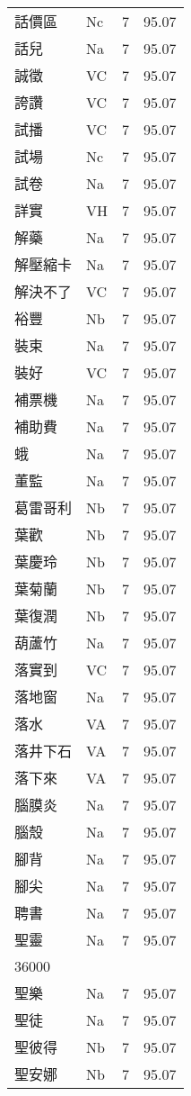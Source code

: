 \documentclass[twocolumn]{book}
\begin{document}
\begin{supertabular}{llrr}
話價區 & Nc & 7 &  95.07\\
話兒 & Na & 7 &  95.07\\
誠徵 & VC & 7 &  95.07\\
誇讚 & VC & 7 &  95.07\\
試播 & VC & 7 &  95.07\\
試場 & Nc & 7 &  95.07\\
試卷 & Na & 7 &  95.07\\
詳實 & VH & 7 &  95.07\\
解藥 & Na & 7 &  95.07\\
解壓縮卡 & Na & 7 &  95.07\\
解決不了 & VC & 7 &  95.07\\
裕豐 & Nb & 7 &  95.07\\
裝束 & Na & 7 &  95.07\\
裝好 & VC & 7 &  95.07\\
補票機 & Na & 7 &  95.07\\
補助費 & Na & 7 &  95.07\\
蛾 & Na & 7 &  95.07\\
董監 & Na & 7 &  95.07\\
葛雷哥利 & Nb & 7 &  95.07\\
葉歡 & Nb & 7 &  95.07\\
葉慶玲 & Nb & 7 &  95.07\\
葉菊蘭 & Nb & 7 &  95.07\\
葉復潤 & Nb & 7 &  95.07\\
葫蘆竹 & Na & 7 &  95.07\\
落實到 & VC & 7 &  95.07\\
落地窗 & Na & 7 &  95.07\\
落水 & VA & 7 &  95.07\\
落井下石 & VA & 7 &  95.07\\
落下來 & VA & 7 &  95.07\\
腦膜炎 & Na & 7 &  95.07\\
腦殼 & Na & 7 &  95.07\\
腳背 & Na & 7 &  95.07\\
腳尖 & Na & 7 &  95.07\\
聘書 & Na & 7 &  95.07\\
聖靈 & Na & 7 &  95.07\\
36000\\
聖樂 & Na & 7 &  95.07\\
聖徒 & Na & 7 &  95.07\\
聖彼得 & Nb & 7 &  95.07\\
聖安娜 & Nb & 7 &  95.07\\

\end{supertabular}
\end{document}
